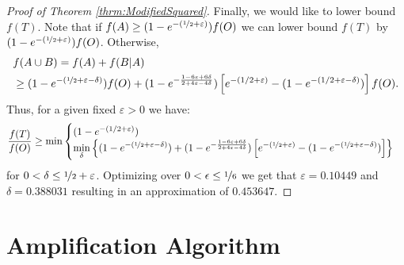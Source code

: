 \documentclass[a4paper,UKenglish,cleveref, autoref]{lipics-v2019}
\begin{document}
\begin{proof}[Proof of Theorem \ref{thrm:ModifiedSquared}]
Finally, we would like to lower bound $f(T)$.
Note that if $f(A) \geq (1 - e^{-(\nicefrac[]{1}{2} + \varepsilon)})f(O)$ we can lower bound $f(T)$ by $(1 - e^{-(\nicefrac[]{1}{2} + \varepsilon)})f(O)$.
Otherwise,
\begin{align}
	&f(A \cup B)
	 = \nonumber
	f(A) + f(B|A)
	\\ & \geq
	(1-e^{-(\nicefrac[]{1}{2} + \varepsilon - \delta)})f(O)
	+
	(1-e^{-\frac{1-6\varepsilon+6\delta}{2+4\varepsilon-4\delta}})
	\left[
	e^{-(1/2 + \varepsilon)}
	- (1 - e^{-(1/2 + \varepsilon - \delta)})
	\right] f(O).
\end{align}
Thus, for a given fixed $\varepsilon > 0$ we have:
\begin{equation}
	\frac{f(T)}{f(O)} \geq  \min \begin{cases}
		(1 - e^{-(1/2 + \varepsilon)})
		\\
			\displaystyle{\min_{\delta}}\left\{
			(1-e^{-(\nicefrac[]{1}{2} + \varepsilon - \delta)})
			+
			(1-e^{-\frac{1-6\varepsilon+6\delta}{2+4\varepsilon-4\delta}})
			\left[
			e^{-(\nicefrac[]{1}{2} + \varepsilon)}
			- (1 - e^{-(\nicefrac[]{1}{2} + \varepsilon - \delta)})
			\right]\right\}
	\end{cases}
\end{equation}
for $0 < \delta \leq \nicefrac[]{1}{2} + \varepsilon$.
Optimizing over $0 < \epsilon \leq \nicefrac[]{1}{6}$ we get that $\varepsilon = 0.10449$ and $\delta = 0.388031$ resulting in an approximation of $0.453647$.
\end{proof}


\section{Amplification Algorithm}\label{sec:Amplification}
\def\pLarge{P_{\text{large}}}
\def\pVal{P_{\text{val}}}
\def\MGreedy{Modified$^2$Greedy}
\def\BOTAlg{BestOfThree}
\def\mA{\mathcal{A}}
\end{document}

